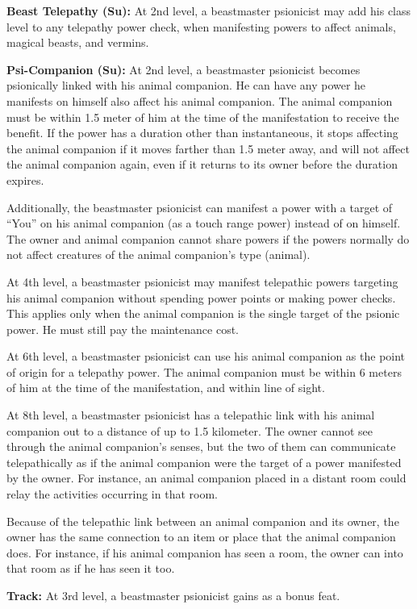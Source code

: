 {\textbf{Beast Telepathy (Su):} At 2nd level, a beastmaster psionicist may add \onehalf his class level to any telepathy power check, when manifesting powers to affect animals, magical beasts, and vermins.

\textbf{Psi-Companion (Su):} At 2nd level, a beastmaster psionicist becomes psionically linked with his animal companion. He can have any power he manifests on himself also affect his animal companion. The animal companion must be within 1.5 meter of him at the time of the manifestation to receive the benefit. If the power has a duration other than instantaneous, it stops affecting the animal companion if it moves farther than 1.5 meter away, and will not affect the animal companion again, even if it returns to its owner before the duration expires.

Additionally, the beastmaster psionicist can manifest a power with a target of ``You'' on his animal companion (as a touch range power) instead of on himself. The owner and animal companion cannot share powers if the powers normally do not affect creatures of the animal companion's type (animal).

At 4th level, a beastmaster psionicist may manifest telepathic powers targeting his animal companion without spending power points or making power checks. This applies only when the animal companion is the single target of the psionic power. He must still pay the maintenance cost.

At 6th level, a beastmaster psionicist can use his animal companion as the point of origin for a telepathy power. The animal companion must be within 6 meters of him at the time of the manifestation, and within line of sight.

At 8th level, a beastmaster psionicist has a telepathic link with his animal companion out to a distance of up to 1.5 kilometer. The owner cannot see through the animal companion's senses, but the two of them can communicate telepathically as if the animal companion were the target of a  power manifested by the owner. For instance, an animal companion placed in a distant room could relay the activities occurring in that room.

Because of the telepathic link between an animal companion and its owner, the owner has the same connection to an item or place that the animal companion does. For instance, if his animal companion has seen a room, the owner can  into that room as if he has seen it too.

\textbf{Track:} At 3rd level, a beastmaster psionicist gains  as a bonus feat.

}

